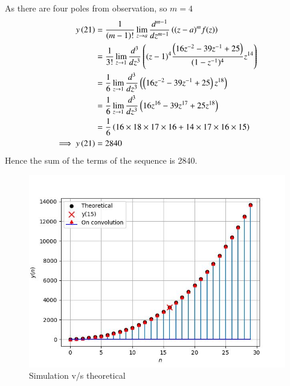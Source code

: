 \documentclass[journal,12pt,twocolumn]{IEEEtran}
\theoremstyle{remark}
\begin{document}
As there are four poles from observation, so $m=4$
\begin{align}
    y\left(21\right) &= \frac{1}{(m-1)!} \lim_{z \to a} \frac{d^{m-1}}{dz^{m-1}}\left((z-a)^mf(z)\right)\\
    &= \frac{1}{3!} \lim_{z \to 1} \frac{d^{3}}{dz^{3}}\left((z-1)^4 \frac{\left(16z^{-2}-39z^{-1}+25\right)}{(1-z^{-1})^4} z^{14}\right)\\
    &= \frac{1}{6} \lim_{z \to 1} \frac{d^{3}}{dz^{3}}\left(\left(16z^{-2}-39z^{-1}+25\right)z^{18}\right)\\
    &= \frac{1}{6} \lim_{z \to 1} \frac{d^{3}}{dz^{3}}\left(16z^{16}-39z^{17}+25z^{18}\right)\\
    &= \frac{1}{6}  \left(16 \times 18 \times 17 \times 16+14 \times 17 \times 16 \times 15 \right)\\
    \implies y\left(21\right)&=2840 
\end{align}
Hence the sum of the terms of the sequence is 2840.

\begin{figure}[h]
    \centering  

\includegraphics[width=\columnwidth]{ncert-maths/11/9/4/5/figs/plot.png}

\begin{center}
    \caption{Simulation v/s theoretical}
\end{center}
\end{figure}
\end{document}
